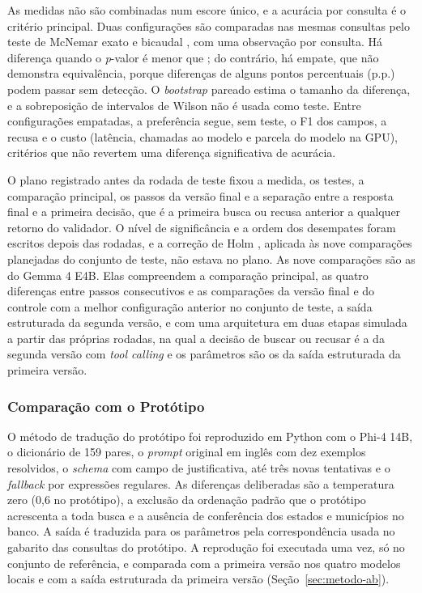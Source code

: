 As medidas não são combinadas num escore único, e a acurácia por consulta é o critério principal. Duas configurações são comparadas nas mesmas consultas pelo teste de McNemar exato e bicaudal \cite{mcnemar1947note}, com uma observação por consulta. Há diferença quando o \textit{p}-valor é menor que ; do contrário, há empate, que não demonstra equivalência, porque diferenças de alguns pontos percentuais (p.p.) podem passar sem detecção. O \textit{bootstrap} pareado \cite{efron1993bootstrap} estima o tamanho da diferença, e a sobreposição de intervalos de Wilson não é usada como teste. Entre configurações empatadas, a preferência segue, sem teste, o F1 dos campos, a recusa e o custo (latência, chamadas ao modelo e parcela do modelo na GPU), critérios que não revertem uma diferença significativa de acurácia.

O plano registrado antes da rodada de teste fixou a medida, os testes, a comparação principal, os passos da versão final e a separação entre a resposta final e a primeira decisão, que é a primeira busca ou recusa anterior a qualquer retorno do validador. O nível de significância e a ordem dos desempates foram escritos depois das rodadas, e a correção de Holm \cite{holm1979simple}, aplicada às nove comparações planejadas do conjunto de teste, não estava no plano. As nove comparações são as do Gemma 4 E4B. Elas compreendem a comparação principal, as quatro diferenças entre passos consecutivos e as comparações da versão final e do controle com a melhor configuração anterior no conjunto de teste, a saída estruturada da segunda versão, e com uma arquitetura em duas etapas simulada a partir das próprias rodadas, na qual a decisão de buscar ou recusar é a da segunda versão com \textit{tool calling} e os parâmetros são os da saída estruturada da primeira versão.

\subsubsection{Comparação com o Protótipo}
\label{sec:metodo-prototipo}

O método de tradução do protótipo foi reproduzido em Python com o Phi-4 14B, o dicionário de 159 pares, o \textit{prompt} original em inglês com dez exemplos resolvidos, o \textit{schema} com campo de justificativa, até três novas tentativas e o \textit{fallback} por expressões regulares. As diferenças deliberadas são a temperatura zero (0,6 no protótipo), a exclusão da ordenação padrão que o protótipo acrescenta a toda busca e a ausência de conferência dos estados e municípios no banco. A saída é traduzida para os parâmetros pela correspondência usada no gabarito das consultas do protótipo. A reprodução foi executada uma vez, só no conjunto de referência, e comparada com a primeira versão nos quatro modelos locais e com a saída estruturada da primeira versão (Seção~\ref{sec:metodo-ab}).


